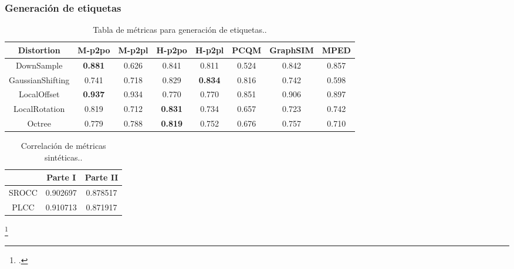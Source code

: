 \begin{frame}
  \frametitle{Generación de etiquetas}
\begin{table}[htp]
    \footnotesize
    \begin{tabular}{|c|c|c|c|c|c|c|c|}
    \hline
        \rowcolor[HTML]{FFC702} 
        \textbf{Distortion} & \textbf{M-p2po} & \textbf{M-p2pl} & \textbf{H-p2po} & \textbf{H-p2pl} & \textbf{PCQM} & \textbf{GraphSIM} & \textbf{MPED} \\ \hline
        DownSample & \textbf{0.881} & 0.626 & 0.841 & 0.811 & 0.524 & 0.842 & 0.857 \\ \hline
        GaussianShifting & 0.741 & 0.718 & 0.829 & \textbf{0.834} & 0.816 & 0.742 & 0.598 \\ \hline
        LocalOffset & \textbf{0.937} & 0.934 & 0.770 & 0.770 & 0.851 & 0.906 & 0.897 \\ \hline
        LocalRotation & 0.819 & 0.712 & \textbf{0.831} & 0.734 & 0.657 & 0.723 & 0.742 \\ \hline
        Octree & 0.779 & 0.788 & \textbf{0.819} & 0.752 & 0.676 & 0.757 & 0.710 \\ \hline
    \end{tabular}
    \caption[Tabla de métricas para generación de etiquetas.]{
      Tabla de métricas para generación de etiquetas.\footnotemark[10].
  }
    \label{tab:MetricsPerDistortion}
    \vspace{-.4cm}
\end{table}
\begin{table}[htp]
  \centering 
  \footnotesize
  \begin{tabular}{|c|c|c|}
    \hline
    \rowcolor[HTML]{FFC702}
     & \textbf{Parte I} & \textbf{Parte II} \\
    \hline 
    SROCC & 0.902697 & 0.878517\\
    \hline
    PLCC & 0.910713 & 0.871917\\
    \hline
  \end{tabular}
  \caption[Correlación de métricas sintéticas.]{
  Correlación de métricas sintéticas.\footnotemark[10]. }
  \label{tab:PseudoCorr}
  \vspace{-.5cm}
\end{table}

\footcitetext{ResSCNN}
\end{frame}

